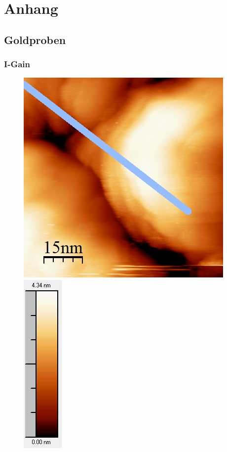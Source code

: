 \documentclass[12pt,a4paper]{article}
\begin{document}
\newpage
\section{Anhang}
\subsection{Goldproben}
\subsubsection{I-Gain}
\begin{figure}[H]
\centering
\includegraphics[scale=0.6]{Bilder/Anhang/IGain/1000_IGain_vor.jpg}
\includegraphics[scale=0.6]{Bilder/Anhang/IGain/1000_IGain_vor_Skala.jpg}

\end{figure}
\end{document}
